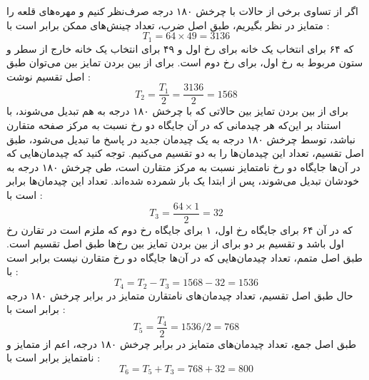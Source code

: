 \p
اگر از تساوی برخی از حالات با چرخش ۱۸۰ درجه صرف‌نظر کنیم و مهره‌های قلعه را متمایز در نظر بگیریم،
طبق اصل ضرب، تعداد چینش‌های ممکن برابر است با :
  $$T_1 = 64 \times 49 = 3136$$
که ۶۴ برای انتخاب یک خانه برای رخ اول و ۴۹ برای انتخاب یک خانه خارج از سطر و ستون
مربوط به رخ اول، برای رخ دوم است. برای از بین بردن تمایز بین می‌توان طبق اصل تقسیم نوشت :
  $$T_2 = \frac{T_1}{2} = \frac{3136}{2} = 1568$$
  \p
برای از بین بردن تمایز بین حالاتی که با چرخش ۱۸۰ درجه به هم تبدیل می‌شوند، با استناد بر این‌که
هر چیدمانی که در آن جایگاه دو رخ نسبت به مرکز صفحه متقارن نباشد، توسط چرخش ۱۸۰ درجه به
یک چیدمان جدید در پاسخ ما تبدیل می‌شود، طبق اصل تقسیم، تعداد این چیدمان‌ها را به دو تقسیم می‌کنیم.
توجه کنید که چیدمان‌هایی که در آن‌ها جایگاه دو رخ نامتمایز نسبت به مرکز متقارن است،
طی چرخش ۱۸۰ درجه به خودشان تبدیل می‌شوند، پس از ابتدا یک بار شمرده شده‌اند. تعداد این چیدمان‌ها
برابر است با : 
  $$T_3 = \frac{64 \times 1}{2} = 32$$
که در آن ۶۴ برای جایگاه رخ اول، ۱ برای جایگاه رخ دوم که ملزم است در تقارن رخ اول باشد
و تقسیم بر دو برای از بین بردن تمایز بین رخ‌ها طبق اصل تقسیم است.
طبق اصل متمم، تعداد چیدمان‌هایی که در آن‌ها جایگاه دو رخ متقارن نیست برابر است با :
  $$T_4 = T_2 - T_3 = 1568 - 32 = 1536$$
  \p
حال طبق اصل تقسیم، تعداد چیدمان‌های نامتقارن متمایز در برابر چرخش ۱۸۰ درجه برابر است با :
  $$T_5 = \frac{T_4}{2} = 1536 / 2 = 768$$
  \p
طبق اصل جمع، تعداد چیدمان‌های متمایز در برابر چرخش ۱۸۰ درجه، اعم از متمایز و نامتمایز برابر است با :
  $$T_6 = T_5 + T_3 = 768 + 32 = 800$$